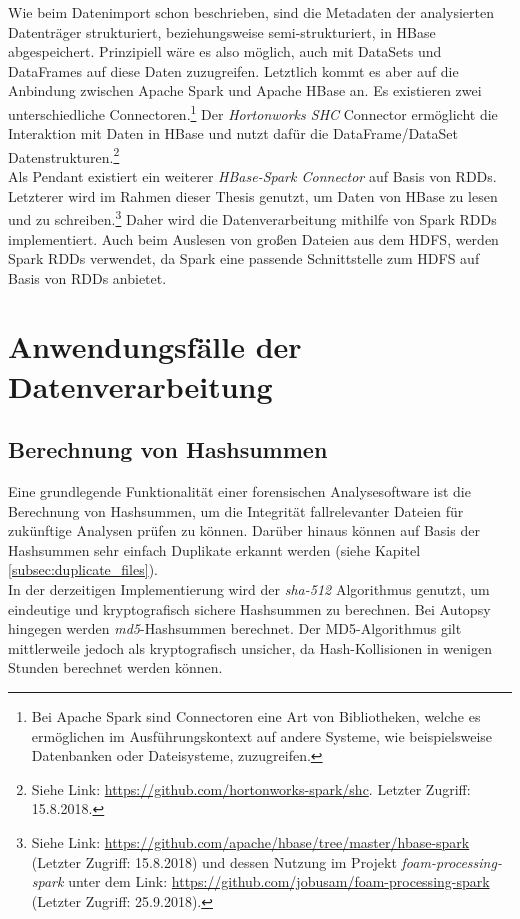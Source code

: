 \noindent
Wie beim Datenimport schon beschrieben, sind die Metadaten der analysierten Datenträger strukturiert, beziehungsweise semi-strukturiert, in HBase abgespeichert. Prinzipiell wäre es also möglich, auch mit DataSets und DataFrames auf diese Daten zuzugreifen. Letztlich kommt es aber auf die Anbindung zwischen Apache Spark und Apache HBase an. Es existieren zwei unterschiedliche Connectoren.\footnote{Bei Apache Spark sind Connectoren eine Art von Bibliotheken, welche es ermöglichen im Ausführungskontext auf andere Systeme, wie beispielsweise Datenbanken oder Dateisysteme, zuzugreifen.} Der \textit{Hortonworks SHC} Connector ermöglicht die Interaktion mit Daten in HBase und nutzt dafür die DataFrame/DataSet Datenstrukturen.\footnote{Siehe Link: \url{https://github.com/hortonworks-spark/shc}. Letzter Zugriff: 15.8.2018.}\\ 
Als Pendant existiert ein weiterer \textit{HBase-Spark Connector} auf Basis von RDDs. Letzterer wird im Rahmen dieser Thesis genutzt, um Daten von HBase zu lesen und zu schreiben.\footnote{Siehe Link: \url{https://github.com/apache/hbase/tree/master/hbase-spark} (Letzter Zugriff: 15.8.2018) und dessen Nutzung im Projekt \textit{foam-processing-spark} unter dem Link: \url{https://github.com/jobusam/foam-processing-spark} (Letzter Zugriff: 25.9.2018).}
Daher wird die Datenverarbeitung mithilfe von Spark RDDs implementiert. Auch beim Auslesen von großen Dateien aus dem HDFS, werden Spark RDDs verwendet, da Spark eine passende Schnittstelle zum HDFS auf Basis von RDDs anbietet.


\section{Anwendungsfälle der Datenverarbeitung}
\subsection{Berechnung von Hashsummen}
Eine grundlegende Funktionalität einer forensischen Analysesoftware ist die Berechnung von Hashsummen, um die Integrität fallrelevanter Dateien für zukünftige Analysen prüfen zu können. Darüber hinaus können auf Basis der Hashsummen sehr einfach Duplikate erkannt werden (siehe Kapitel \ref{subsec:duplicate_files}).\\
In der derzeitigen Implementierung wird der \textit{\acrshort{sha}-512} Algorithmus genutzt, um eindeutige und kryptografisch sichere Hashsummen zu berechnen. Bei Autopsy hingegen werden \textit{\acrshort{md5}}-Hashsummen berechnet. Der MD5-Algorithmus gilt mittlerweile jedoch als kryptografisch unsicher, da Hash-Kollisionen in wenigen Stunden berechnet werden können.\cite[S. 240-243]{hacking_and_security}\\

